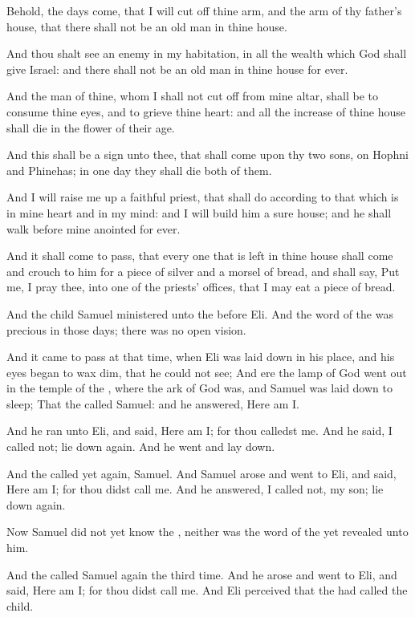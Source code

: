 \Verse Behold, the days come, that I will cut off thine arm, and the arm of thy father's house, that there shall not be an old man in thine house.

\Verse And thou shalt see an enemy in my habitation, in all the wealth which God shall give Israel: and there shall not be an old man in thine house for ever.

\Verse And the man of thine, whom I shall not cut off from mine altar, shall be to consume thine eyes, and to grieve thine heart: and all the increase of thine house shall die in the flower of their age.

\Verse And this shall be a sign unto thee, that shall come upon thy two sons, on Hophni and Phinehas; in one day they shall die both of them.

\Verse And I will raise me up a faithful priest, that shall do according to that which is in mine heart and in my mind: and I will build him a sure house; and he shall walk before mine anointed for ever.

\Verse And it shall come to pass, that every one that is left in thine house shall come and crouch to him for a piece of silver and a morsel of bread, and shall say, Put me, I pray thee, into one of the priests' offices, that I may eat a piece of bread.


\Chapter
\Verse And the child Samuel ministered unto the \LORD before Eli. And the word of the \LORD was precious in those days; there was no open vision.

\Verse And it came to pass at that time, when Eli was laid down in his place, and his eyes began to wax dim, that he could not see; \Verse And ere the lamp of God went out in the temple of the \LORD, where the ark of God was, and Samuel was laid down to sleep; \Verse That the \LORD called Samuel: and he answered, Here am I.

\Verse And he ran unto Eli, and said, Here am I; for thou calledst me.  And he said, I called not; lie down again. And he went and lay down.

\Verse And the \LORD called yet again, Samuel. And Samuel arose and went to Eli, and said, Here am I; for thou didst call me. And he answered, I called not, my son; lie down again.

\Verse Now Samuel did not yet know the \LORD, neither was the word of the \LORD yet revealed unto him.

\Verse And the \LORD called Samuel again the third time. And he arose and went to Eli, and said, Here am I; for thou didst call me. And Eli perceived that the \LORD had called the child.

